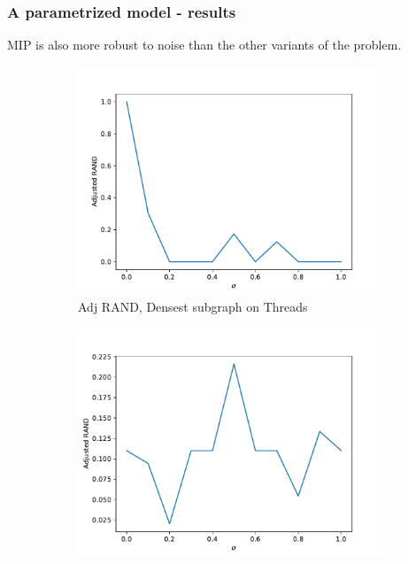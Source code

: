 \documentclass{beamer}
\begin{document}
\begin{frame}[c]
	\frametitle{A parametrized model - results}

	MIP is also more robust to noise than the other variants of the problem.

	\begin{figure}
		\begin{center}
			\begin{subfigure}[t]{0.3\textwidth}
				\centering
				\includegraphics[width=\textwidth]{out/synthetic_densest_nc/model2_sigmas_adj_rand.pdf}
				\caption{Adj RAND, Densest subgraph on Threads}
				\label{fig:out/synthetic_densest_nc/model2_sigmas_adj_rand.pdf}
			\end{subfigure}
			\begin{subfigure}[t]{0.3\textwidth}
				\centering
				\includegraphics[width=\textwidth]{out/synthetic_o2_bff/model2_sigmas_adj_rand.pdf}

\end{subfigure}
\end{center}
\end{figure}
\end{frame}
\end{document}
